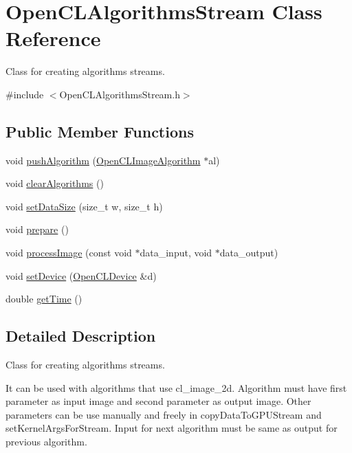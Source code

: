 \hypertarget{class_open_c_l_algorithms_stream}{\section{Open\-C\-L\-Algorithms\-Stream Class Reference}
\label{class_open_c_l_algorithms_stream}
}


Class for creating algorithms streams.  




{\ttfamily \#include $<$Open\-C\-L\-Algorithms\-Stream.\-h$>$}

\subsection*{Public Member Functions}
\begin{DoxyCompactItemize}
\item 
void \hyperlink{class_open_c_l_algorithms_stream_abf3cd39341605a40e7a49302f1f11f1d}{push\-Algorithm} (\hyperlink{class_open_c_l_image_algorithm}{Open\-C\-L\-Image\-Algorithm} $\ast$al)
\item 
void \hyperlink{class_open_c_l_algorithms_stream_a3854966e3f381639e7b10dafc142b63a}{clear\-Algorithms} ()
\item 
void \hyperlink{class_open_c_l_algorithms_stream_a7f0553ee23b81eb9ab4266cde99c1099}{set\-Data\-Size} (size\-\_\-t w, size\-\_\-t h)
\item 
void \hyperlink{class_open_c_l_algorithms_stream_a6bf87e51a5c322b613846eb4007ff200}{prepare} ()
\item 
void \hyperlink{class_open_c_l_algorithms_stream_ad2c501c0b348a5d1d5067738ac375e7d}{process\-Image} (const void $\ast$data\-\_\-input, void $\ast$data\-\_\-output)
\item 
void \hyperlink{class_open_c_l_algorithms_stream_ab12a6a4c643d0446daacb1290fbaa3f9}{set\-Device} (\hyperlink{class_open_c_l_device}{Open\-C\-L\-Device} \&d)
\item 
double \hyperlink{class_open_c_l_algorithms_stream_a7e5fc365834000c2132498e3d6d1f028}{get\-Time} ()
\end{DoxyCompactItemize}


\subsection{Detailed Description}
Class for creating algorithms streams. 

It can be used with algorithms that use cl\-\_\-image\-\_\-2d. Algorithm must have first parameter as input image and second parameter as output image. Other parameters can be use manually and freely in copy\-Data\-To\-G\-P\-U\-Stream and set\-Kernel\-Args\-For\-Stream. Input for next algorithm must be same as output for previous algorithm. 

